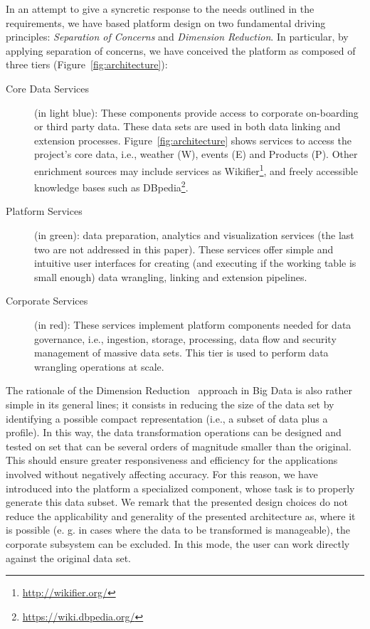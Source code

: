 In an attempt to give a syncretic response to the needs outlined in the requirements, we have based platform design on two fundamental driving principles:  \textit{Separation of Concerns} and \textit{Dimension Reduction}.  
In particular, by applying separation of concerns, we have conceived the platform as composed of three tiers (Figure~\ref{fig:architecture}):

\begin{description}
    \item[Core Data Services] (in light blue): These components provide access to corporate on-boarding or third party data. These data sets are used in both data linking and extension processes. Figure~\ref{fig:architecture} shows services to access the project's core data, i.e., weather (W), events (E) and Products (P). Other enrichment sources may include services as Wikifier\footnote{\url{http://wikifier.org/}}, and freely accessible knowledge bases such as DBpedia\footnote{\url{https://wiki.dbpedia.org/}}.
    \item[Platform Services] (in green): data preparation, analytics and visualization services (the last two are not addressed in this paper). These services offer simple and intuitive user interfaces for creating (and executing if the working table is small enough) data wrangling, linking and extension pipelines.
    \item[Corporate Services] (in red): These services implement platform components needed for data governance, i.e., ingestion, storage, processing, data flow and security management of massive data sets. This tier is used to perform data wrangling operations at scale. 
\end{description}


The rationale of the Dimension Reduction~\cite{rojas2017sampling, ur2016big} approach in Big Data is also rather simple in its general lines; it consists in reducing the size of the data set by identifying a possible compact representation (i.e., a subset of data plus a profile). In this way, the data transformation operations can be designed and tested on set that can be several orders of magnitude smaller than the original. This should ensure greater responsiveness and efficiency for the applications involved without negatively affecting accuracy. For this reason, we have introduced into the platform a specialized component, whose task is to properly generate this data subset. 
We remark that the presented design choices do not reduce the applicability and generality of the presented architecture as, where it is possible (e. g. in cases where the data to be transformed is manageable), the corporate subsystem can be excluded. In this mode, the user can work directly against the original data set.


